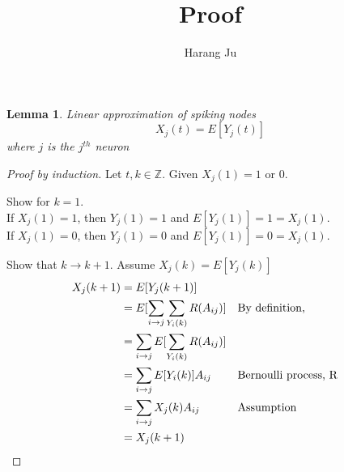 \documentclass{article}
\begin{document}
\title{Proof}
\author{Harang Ju}


\newtheorem{linear approx}{Lemma}

\begin{linear approx}
Linear approximation of spiking nodes
\[
X_j(t) = E[Y_j(t)]
\]
where $j$ is the $j^{th}$ neuron
\end{linear approx}

\begin{proof}[Proof by induction]
Let $t, k \in \mathbb{Z}$. Given $X_j(1) = 1 $ or $0$.

Show for $k=1$.\\
\indent \indent If $X_j(1) = 1$, then $Y_j(1) = 1$ and $E[Y_j(1)] = 1 = X_j(1)$. \\
\indent \indent If $X_j(1) = 0$, then $Y_j(1) = 0$ and $E[Y_j(1)] = 0 = X_j(1)$.

Show that $k \rightarrow k+1$.
Assume $X_j(k) = E[Y_j(k)]$
\begin{align*}
    X_j(k+1) &= E[Y_j(k+1)] \\
    &= E[\sum_{i\rightarrow j} \sum_{Y_i(k)} R(A_{ij})] &&\text{By definition,} \\
    &= \sum_{i\rightarrow j} E[\sum_{Y_i(k)} R(A_{ij})] \\
    &= \sum_{i\rightarrow j} E[Y_i(k)]A_{ij} &&\text{Bernoulli process, R} \\
    &= \sum_{i\rightarrow j} X_j(k)A_{ij} &&\text{Assumption} \\
    &= X_j(k+1) &&\qedhere
\end{align*}
\end{proof}
\end{document}
